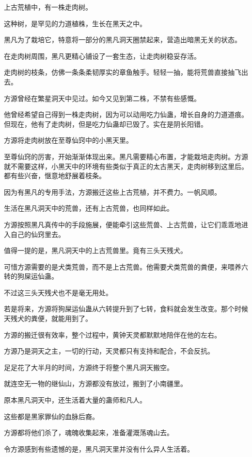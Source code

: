\begin{this_body}
上古荒植中，有一株走肉树。

这种树，是罕见的力道植株，生长在黑天之中。

黑凡为了栽培它，特意将一部分的黑凡洞天圈禁起来，营造出暗黑无关的状态。

在走肉树周围，黑凡更精心铺设了一套生态，让走肉树稳妥存活。

走肉树的枝条，仿佛一条条柔韧厚实的章鱼触手。轻轻一抽，能将荒兽直接抽飞出去。

方源曾经在繁星洞天中见过。如今又见到第二株，不禁有些感慨。

他曾经希望自己得到一株走肉树，因为可以动用吃力仙蛊，增长自身的力道道痕。但现在，他有了走肉树，但是吃力仙蛊却已毁了。实在是阴长阳错。

方源将走肉树放在至尊仙窍中的小黑天里。

至尊仙窍的厉害，开始渐渐体现出来。黑凡需要精心布置，才能栽培走肉树。方源就不需要这样，小黑天中的环境有些类似于真正的太古黑天，走肉树移到这里后。都有些兴奋，惬意地舒展着枝条。

因为有黑凡的专用手法，方源搬迁这些上古荒植，并不费力。一帆风顺。

生活在黑凡洞天中的荒兽，还有上古荒兽，也同样如此。

方源按照黑凡真传中的手段施展，便能牵引这些荒兽、上古荒兽，让它们乖乖地进入自己的仙窍里去。

值得一提的是，黑凡洞天中的上古荒兽里。竟有三头天残犬。

可惜方源需要的是犬类荒兽，而不是上古荒兽。他需要犬类荒兽的粪便，来喂养六转的狗屎运仙蛊。

不过这三头天残犬也不是毫无用处。

若是将来，方源将狗屎运仙蛊从六转提升到了七转，食料就会发生改变。那个时候天残犬的粪便，就能用到了。

方源的搬迁很有效率，整个过程中，黄钟天灵都默默地陪伴在他的左右。

方源乃是洞天之主，一切的行动，天灵都只有支持和配合，不会反抗。

足足花了大半月的时间，方源终于将整个黑凡洞天搬空。

就连空无一物的继仙山，方源都没有放过，搬到了小南疆里。

原本黑凡洞天中，还生活着大量的蛊师和凡人。

这些都是黑家罪仙的血脉后裔。

方源都将他们杀了，魂魄收集起来，准备灌溉荡魂山去。

令方源感到有些遗憾的是，黑凡洞天里并没有什么异人生活着。


\end{this_body}
